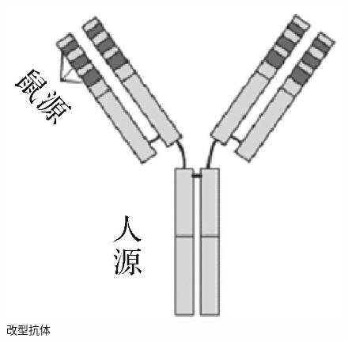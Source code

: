 \begin{figure}[!htbp]
 \centering
 \includegraphics{./images/Image00075.jpg}
 \captionsetup{justification=centering}
 \caption{改型抗体}
 \label{fig4-15}
  \end{figure} 

